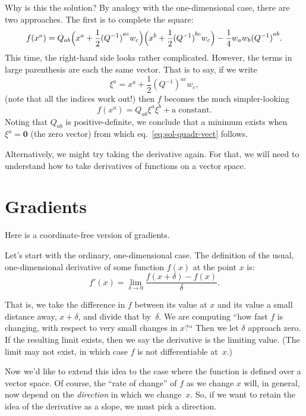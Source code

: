 \documentclass[10pt, a4paper]{article}
\newcommand{\bzero}{\mathbold{0}} %
\begin{document}
Why is this the solution? By analogy with the one-dimensional case,
there are two approaches. The first is to complete the square:
\begin{equation*}
  f(x^a) = Q_{ab}\Bigl(x^a +
  \frac{1}{2}{(Q^{-1})}^{ac}w_c\Bigr)\Bigl(x^b +
  \frac{1}{2}{(Q^{-1})}^{bc}w_c\Bigr) - \frac{1}{4}w_aw_b{(Q^{-1})}^{ab}.
\end{equation*}
This time, the right-hand side looks rather complicated. However, the
terms in large parenthesis are each the same vector. That is to say,
if we write
\begin{equation*}
  \xi^a = x^a +  \frac{1}{2}{(Q^{-1})}^{ac}w_c,
\end{equation*}
(note that all the indices work out!) then $f$ becomes the much
simpler-looking
\begin{equation*}
  f(x^a) = Q_{ab}\xi^a\xi^b + \text{a constant}.
\end{equation*}
Noting that $Q_{ab}$ is positive-definite, we conclude that a minimum
exists when $\xi^a = \bzero$ (the zero vector) from which
eq.~\ref{eq:sol-quadr-vect} follows.

Alternatively, we might try taking the derivative again. For that, we
will need to understand how to take derivatives of functions on a
vector space.

\section*{Gradients}

Here is a coordinate-free version of gradients.

Let's start with the ordinary, one-dimensional case. The definition of
the usual, one-dimensional derivative of some function $f(x)$ at the
point $x$ is:
\begin{equation*}
  f'(x) = \lim_{\delta\to0} \frac{f(x+\delta) - f(x)}{\delta}.
\label{eq:ordinary-derivative}
\end{equation*}

That is, we take the difference in $f$ between its value at $x$ and
its value a small distance away, $x+\delta$, and divide that
by~$\delta$. We are computing “how fast $f$ is changing, with respect to
very small changes in $x$?“ Then we let $\delta$ approach zero. If the
resulting limit exists, then we say the derivative is the limiting
value. (The limit may not exist, in which case $f$ is not
differentiable at~$x$.)

Now we'd like to extend this idea to the case where the function is
defined over a vector space. Of course, the “rate of change” of $f$ as
we change $x$ will, in general, now depend on the \emph{direction} in
which we change~$x$. So, if we want to retain the idea of the
derivative as a slope, we must pick a direction.
\end{document}

